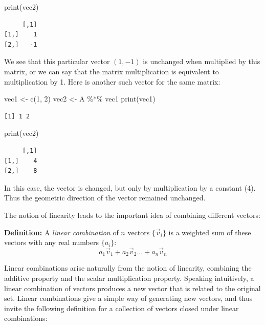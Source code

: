\documentclass[
  letterpaper,
  DIV=11,
  numbers=noendperiod]{scrreprt}
\newenvironment{Shaded}{\begin{snugshade}}{\end{snugshade}}
\newcommand{\DecValTok}[1]{\textcolor[rgb]{0.68,0.00,0.00}{#1}}
\newcommand{\FunctionTok}[1]{\textcolor[rgb]{0.28,0.35,0.67}{#1}}
\newcommand{\NormalTok}[1]{\textcolor[rgb]{0.00,0.23,0.31}{#1}}
\newcommand{\OtherTok}[1]{\textcolor[rgb]{0.00,0.23,0.31}{#1}}
\newcommand{\SpecialCharTok}[1]{\textcolor[rgb]{0.37,0.37,0.37}{#1}}
\begin{document}
\begin{Shaded}
\begin{Highlighting}[]
\FunctionTok{print}\NormalTok{(vec2)}
\end{Highlighting}
\end{Shaded}

\begin{verbatim}
     [,1]
[1,]    1
[2,]   -1
\end{verbatim}

We see that this particular vector \((1,-1)\) is unchanged when
multiplied by this matrix, or we can say that the matrix multiplication
is equivalent to multiplication by 1. Here is another such vector for
the same matrix:

\begin{Shaded}
\begin{Highlighting}[]
\NormalTok{vec1 }\OtherTok{\textless{}{-}} \FunctionTok{c}\NormalTok{(}\DecValTok{1}\NormalTok{, }\DecValTok{2}\NormalTok{)}
\NormalTok{vec2 }\OtherTok{\textless{}{-}}\NormalTok{ A }\SpecialCharTok{\%*\%}\NormalTok{ vec1}
\FunctionTok{print}\NormalTok{(vec1)}
\end{Highlighting}
\end{Shaded}

\begin{verbatim}
[1] 1 2
\end{verbatim}

\begin{Shaded}
\begin{Highlighting}[]
\FunctionTok{print}\NormalTok{(vec2)}
\end{Highlighting}
\end{Shaded}

\begin{verbatim}
     [,1]
[1,]    4
[2,]    8
\end{verbatim}

In this case, the vector is changed, but only by multiplication by a
constant (4). Thus the geometric direction of the vector remained
unchanged.

The notion of linearity leads to the important idea of combining
different vectors:

\textbf{Definition:} A \emph{linear combination} of \(n\) vectors
\(\{ \vec v_i \}\) is a weighted sum of these vectors with any real
numbers \(\{a_i\}\): \[ a_1 \vec v_1+ a_2 \vec v_2... + a_n \vec v_n\]

Linear combinations arise naturally from the notion of linearity,
combining the additive property and the scalar multiplication property.
Speaking intuitively, a linear combination of vectors produces a new
vector that is related to the original set. Linear combinations give a
simple way of generating new vectors, and thus invite the following
definition for a collection of vectors closed under linear combinations:
\end{document}
